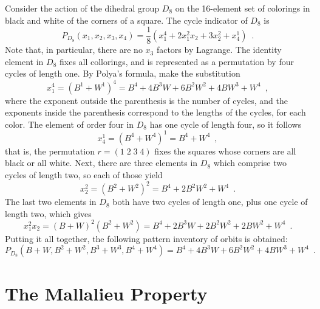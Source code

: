 \begin{example}
	\cite[249]{Tucker1974}
	Consider the action of the dihedral group $D_8$ on the 16-element set of colorings in
	black and white of the corners of a square. The cycle indicator of $D_8$ is
	\begin{equation}
		P_{D_8}(x_1, x_2, x_3, x_4) =
		\frac{1}{8}(x_1^4 + 2x_1^2x_2 + 3x_2^2 + x_4^1) \enspace.
	\end{equation}
	Note that, in particular, there are no $x_3$ factors by Lagrange. The identity element
	in $D_8$ fixes all collorings, and is represented as a permutation by four cycles
	of length one. By Polya's formula, make the substitution
	\begin{equation}
		x_1^4 = (B^1 + W^1)^4 = B^4 + 4 B^3 W + 6 B^2 W^2 + 4 B W^3 + W^4 \enspace,
	\end{equation}
	where the exponent outside the parenthesis is the number of cycles, and the exponents
	inside the parenthesis correspond to the lengths of the cycles, for each color.
	The element of order four in $D_8$ has one cycle of length four, so it follows
	\begin{equation}
		x_4^1 = (B^4 + W^4)^1 = B^4 + W^4 \enspace,
	\end{equation}
	that is, the permutation $r = (1 \; 2 \; 3 \; 4)$ fixes the squares whose corners are
	all black or all white. Next, there are three elements in $D_8$ which comprise
	two cycles of length two, so each of those yield
	\begin{equation}
		x_2^2 = (B^2 + W^2)^2 = B^4 + 2 B^2 W^2 + W^4 \enspace.
	\end{equation}
	The last two elements in $D_8$ both have two cycles of length one, plus one cycle
	of length two, which gives
	\begin{equation}
		x_1^2x_2 = (B + W)^2 (B^2 + W^2) =
		B^4 + 2 B^3 W + 2 B^2 W^2 + 2 B W^2 + W^4 \enspace.
	\end{equation}
	Putting it all together, the following pattern inventory of orbits is obtained:
	\begin{equation}
		P_{D_8}(B + W, B^2 + W^2, B^3 + W^3, B^4 + W^4) =
		B^4 + 4 B^3 W + 6 B^2 W^2 + 4 B W^3 + W^4 \enspace.
	\end{equation}
\end{example}

\chapter{The Mallalieu Property}
\label{app:mallalieu}

